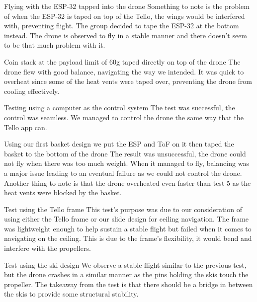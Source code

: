 \documentclass[12pt]{article}
\begin{document}
                 {Flying with the ESP-32 tapped into the drone} {
                    Something to note is the problem of when the ESP-32 is taped on top of the Tello, the wings would be interfered with, preventing flight.
                    The group decided to tape the ESP-32 at the bottom instead.
                    The drone is observed to fly in a stable manner and there doesn't seem to be that much problem with it.
                }

                 {Coin stack at the payload limit of 60g taped directly on top of the drone} {
                    The drone flew with good balance, navigating the way we intended.
                    It was quick to overheat since some of the heat vents were taped over, preventing the drone from cooling effectively.
                }

                 {Testing using a computer as the control system} {
                    The test was successful, the control was seamless.
                    We managed to control the drone the same way that the Tello app can.
                }

                 {Using our first basket design we put the ESP and ToF on it then taped the basket to the bottom of the drone} {
                    The result was unsuccessful, the drone could not fly when there was too much weight.
                    When it managed to fly, balancing was a major issue leading to an eventual failure as we could not control the drone.
                    Another thing to note is that the drone overheated even faster than test 5 as the heat vents were blocked by the basket.
                }

                 {Test using the Tello frame} {
                    This test's purpose was due to our consideration of using either the Tello frame or our slide design for ceiling navigation.
                    The frame was lightweight enough to help sustain a stable flight but failed when it comes to navigating on the ceiling.
                    This is due to the frame's flexibility, it would bend and interfere with the propellers.
                }

                 {Test using the ski design} {
                    We observe a stable flight similar to the previous test, but the drone crashes in a similar manner as the pins holding the skis touch the propeller.
                    The takeaway from the test is that there should be a bridge in between the skis to provide some structural stability.
                }
\end{document}
